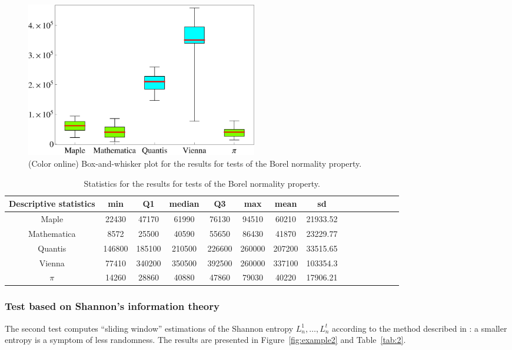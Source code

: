\documentclass[10pt]{article}%
\begin{document}
\begin{figure}[htbp] %
   \centering
   \includegraphics[width=4in]{2009-QvPR-boxborelk2}
   \caption{(Color online) Box-and-whisker plot for the results for tests of the Borel normality property.}
   \label{fig:example1}
\end{figure}

\begin{table}
\caption{Statistics for the results for tests of the Borel normality property.}\label{tab:1}
\begin{center}
\begin{tabular}
[c]{c c c c c c c c c c c c c c c }%
\hline\hline
Descriptive statistics & min & Q1 & median & Q3 & max & mean & sd\\\hline
Maple & 22430 & 47170 & 61990 & 76130 & 94510 & 60210 & 21933.52\\
Mathematica & 8572 & 25500 & 40590 & 55650 & 86430 & 41870 & 23229.77\\
Quantis & 146800 & 185100 & 210500 & 226600 & 260000 & 207200 & 33515.65\\
Vienna & 77410 & 340200 & 350500 & 392500 & 260000 & 337100 & 103354.3\\
$\pi$ & 14260 & 28860 & 40880 & 47860 & 79030 & 40220 & 17906.21\\\hline\hline
\end{tabular}
\end{center}
\end{table}



\subsubsection{Test based on Shannon's information theory}

The second test
computes  ``sliding window'' estimations of the Shannon entropy $L_n^1, \ldots ,L_n^t$ according to the method described in
\cite{Wyner}: a smaller  entropy is a symptom of  less randomness.
The results are presented in
Figure~\ref{fig:example2} and Table~\ref{tab:2}.
\end{document}

